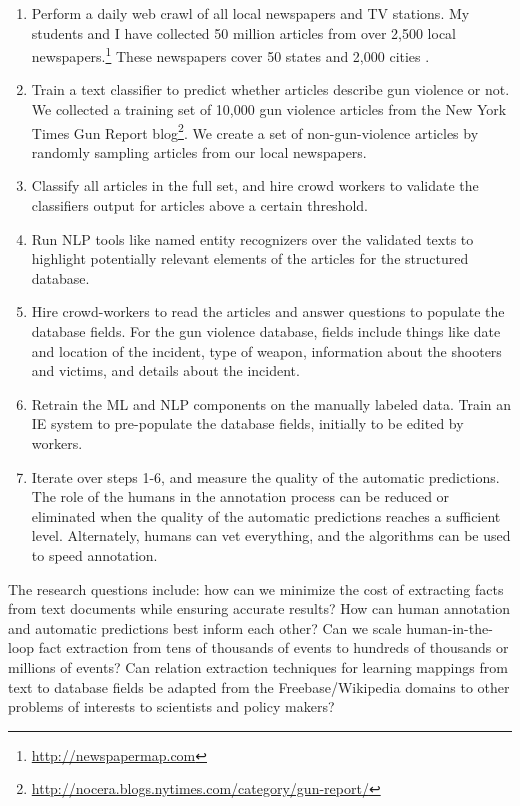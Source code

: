 \documentclass[11pt]{article}
\begin{document}
\begin{enumerate}
\item Perform a daily web crawl of all local newspapers and TV stations.  My students and I have collected 50 million articles from over 2,500 local newspapers.\footnote{\url{http://newspapermap.com}} These newspapers cover 50 states and 2,000 cities \cite{Irvine-EtAl-2014:LREC}.
\item Train a text classifier to predict whether articles describe gun violence or not.  We collected a training set of 10,000 gun violence articles  from the  New York Times Gun Report blog\footnote{\url{http://nocera.blogs.nytimes.com/category/gun-report/}}. We create a set of non-gun-violence articles by randomly sampling articles from our local newspapers.
\item Classify all articles in the full set, and hire crowd workers to validate the classifiers output for articles above a certain threshold.
\item Run NLP tools like named entity recognizers over the validated texts to highlight potentially relevant elements of the articles for the structured database.
\item Hire crowd-workers to read the articles and answer questions to populate the database fields.  For the gun violence database, fields include things like date and location of the incident, type of weapon, information about the shooters and victims, and details about the incident. 
\item Retrain the ML and NLP components on the manually labeled data.  Train an IE system to pre-populate the database fields, initially to be edited by workers.
\item Iterate over steps 1-6, and measure the quality of the automatic predictions. The role of the humans in the annotation process can be reduced or eliminated when the quality of the automatic predictions reaches a sufficient level.  Alternately, humans can vet everything, and the algorithms can be used to speed annotation.
\end{enumerate}

The research questions include: how can we minimize the cost of extracting facts from text documents while ensuring accurate results?  How can human annotation and automatic predictions best inform each other?  Can we scale human-in-the-loop fact extraction from tens of thousands of events to hundreds of thousands or millions of events?   Can relation extraction techniques for learning mappings from text to database fields be adapted from the Freebase/Wikipedia domains to other problems of interests to scientists and policy makers? 
\end{document}
